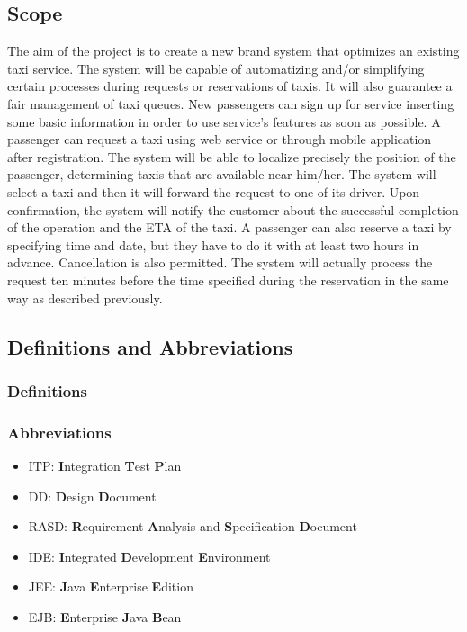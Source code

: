 \subsection{Scope}
The aim of the project is to create a new brand system that optimizes an 
existing taxi service.
The system will be capable of automatizing and/or simplifying certain 
processes during requests or reservations of taxis.
It will also guarantee a fair management of taxi queues.
New passengers can sign up for service inserting some basic information in order to use service's features as soon as possible.
A passenger can request a taxi using web service or through mobile
application after registration. The system will be able to localize precisely the position
of the passenger, determining taxis that are available near
him/her. The system will select a taxi and then it will forward the request to one of its driver.
Upon confirmation, the system will notify the customer about the successful completion of the operation and the ETA of the taxi. A passenger can also reserve a taxi by specifying time and date, but they have to do it with at least two hours in advance. Cancellation is also permitted. The system will actually process the request ten minutes before the time specified during the reservation in the same way as described previously.
\subsection{Definitions and Abbreviations}
\subsubsection{Definitions}
\subsubsection{Abbreviations}
\begin{itemize}
	\item ITP: \textbf{I}ntegration \textbf{T}est \textbf{P}lan
	\item DD: \textbf{D}esign \textbf{D}ocument
	\item RASD: \textbf{R}equirement \textbf{A}nalysis and \textbf{S}pecification \textbf{D}ocument
	\item IDE: \textbf{I}ntegrated \textbf{D}evelopment \textbf{E}nvironment
	\item JEE: \textbf{J}ava \textbf{E}nterprise \textbf{E}dition
	\item EJB: \textbf{E}nterprise \textbf{J}ava \textbf{B}ean
\end{itemize}

